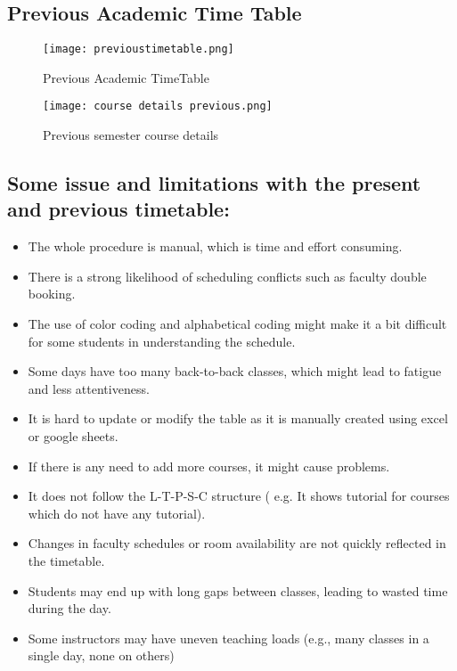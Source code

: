 \documentclass[12pt]{article}
\newcounter{procedure}
\begin{document}
\subsection{Previous Academic Time Table}
\begin{figure}[H]
    \centering
    \texttt{[image: previoustimetable.png]}
    \caption{Previous Academic TimeTable}
    \label{fig:placeholder}
\end{figure}

\begin{figure}[H]
    \centering
    \texttt{[image: course details previous.png]}
    \caption{Previous semester course details}
    \label{fig:placeholder}
\end{figure}
\subsection*{Some issue and limitations with the present and previous timetable: }
\begin{itemize}
    \item \large{The whole procedure is manual, which is time and effort consuming.}
    \item \large{There is a strong likelihood of scheduling conflicts such as faculty double booking.}
    \item \large{The use of color coding and alphabetical coding might make it a bit difficult for some students in understanding the schedule.}
    \item \large{Some days have too many back-to-back classes, which might lead to fatigue and less attentiveness.}
    \item \large{It is hard to update or modify the table as it is manually created using excel or google sheets.}
    \item \large{If there is any need to add more courses, it might cause problems.}
    \item \large{It does not follow the L-T-P-S-C structure ( e.g. It shows tutorial for courses which do not have any tutorial).}
    \item \large{Changes in faculty schedules or room availability are not quickly reflected in the timetable.}
    \item \large{Students may end up with long gaps between classes, leading to wasted time during the day.}
    \item \large{Some instructors may have uneven teaching loads (e.g., many classes in a single day, none on others)}
\end{itemize}
\end{document}
